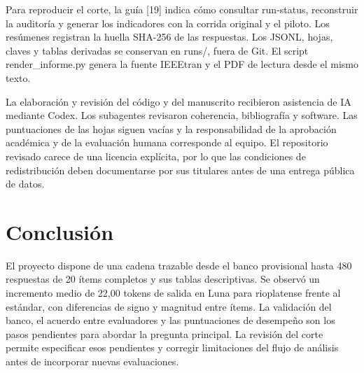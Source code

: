 \documentclass[conference]{IEEEtran}
\begin{document}
Para reproducir el corte, la guía [19] indica cómo consultar run-status, reconstruir la auditoría y generar los indicadores con la corrida original y el piloto. Los resúmenes registran la huella SHA-256 de las respuestas. Los JSONL, hojas, claves y tablas derivadas se conservan en runs/, fuera de Git. El script render\_informe.py genera la fuente IEEEtran y el PDF de lectura desde el mismo texto.

La elaboración y revisión del código y del manuscrito recibieron asistencia de IA mediante Codex. Los subagentes revisaron coherencia, bibliografía y software. Las puntuaciones de las hojas siguen vacías y la responsabilidad de la aprobación académica y de la evaluación humana corresponde al equipo. El repositorio revisado carece de una licencia explícita, por lo que las condiciones de redistribución deben documentarse por sus titulares antes de una entrega pública de datos.

\section{Conclusión}
El proyecto dispone de una cadena trazable desde el banco provisional hasta 480 respuestas de 20 ítems completos y sus tablas descriptivas. Se observó un incremento medio de 22,00 tokens de salida en Luna para rioplatense frente al estándar, con diferencias de signo y magnitud entre ítems. La validación del banco, el acuerdo entre evaluadores y las puntuaciones de desempeño son los pasos pendientes para abordar la pregunta principal. La revisión del corte permite especificar esos pendientes y corregir limitaciones del flujo de análisis antes de incorporar nuevas evaluaciones.
\end{document}
